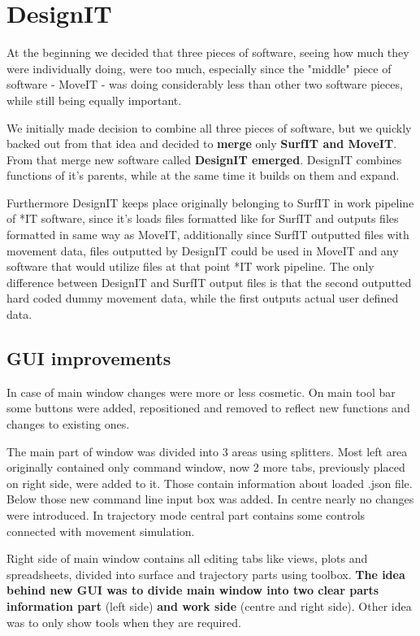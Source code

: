 \documentclass[a4paper, 11pt, article]{report}
\begin{document}

\section{DesignIT}

At the beginning we decided that three pieces of software, seeing how much they were individually doing, were too much, especially since the "middle" piece of software - MoveIT - was doing considerably less than other two software pieces, while still being equally important. 

We initially made decision to combine all three pieces of software, but we quickly backed out from that idea and decided to \textbf{merge} only \textbf{SurfIT and MoveIT}. From that merge new software called \textbf{DesignIT emerged}. DesignIT combines functions of it's parents, while at the same time it builds on them and expand. 

Furthermore DesignIT keeps place originally belonging to SurfIT in work pipeline of *IT software, since it's loads files formatted like for SurfIT and outputs files formatted in same way as MoveIT, additionally since SurfIT outputted files with movement data, files outputted by DesignIT could be used in MoveIT and any software that would utilize files at that point *IT work pipeline. The only difference between DesignIT and SurfIT output files is that the second outputted hard coded dummy movement data, while the first outputs actual user defined data.

\subsection{GUI improvements}

In case of main window changes were more or less cosmetic. On main tool bar some buttons were added, repositioned and removed to reflect new functions and changes to existing ones. 

The main part of window was divided into 3 areas using splitters. Most left area originally contained only command window, now 2 more tabs, previously placed on right side, were added to it. Those contain information about loaded .json file. Below those new command line input box was added. In centre nearly no changes were introduced. In trajectory mode central part contains some controls connected with movement simulation. 

Right side of main window contains all editing tabs like views, plots and spreadsheets, divided into surface and trajectory parts using toolbox. \textbf{The idea behind new GUI was to divide main window into two clear parts information part} (left side) \textbf{and work side} (centre and right side). Other idea was to only show tools when they are required.
\end{document}
